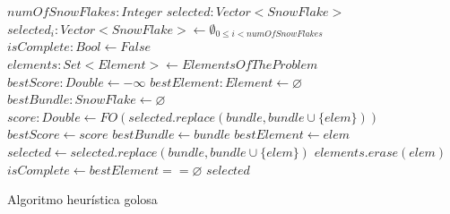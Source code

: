 \begin{algorithm}[H]
\begin{algorithmic}[1]
\REQUIRE $numOfSnowFlakes:Integer$
\ENSURE $selected:Vector<SnowFlake>$
\STATE $selected_{i}:Vector<SnowFlake> \leftarrow \emptyset_{0\leq i<numOfSnowFlakes}$
\STATE $isComplete:Bool \leftarrow False$
\STATE $elements:Set<Element> \leftarrow ElementsOfTheProblem$
  \STATE $bestScore:Double \leftarrow -\infty$
  \STATE $bestElement:Element \leftarrow \varnothing$
  \STATE $bestBundle:SnowFlake \leftarrow \varnothing$
        \STATE $score:Double \leftarrow FO(selected.replace(bundle, bundle \cup \{elem\}))$
          \STATE $bestScore \leftarrow score$
          \STATE $bestBundle \leftarrow bundle$
          \STATE $bestElement \leftarrow elem$
        \ENDIF
      \ENDIF
    \ENDFOR
  \ENDFOR
  \STATE $selected \leftarrow selected.replace(bundle, bundle \cup \{elem\})$
  \STATE $elements.erase(elem)$
  \STATE $isComplete \leftarrow bestElement == \varnothing$
\ENDWHILE
\RETURN $selected$
\end{algorithmic}
\caption{Algoritmo heurística golosa}\label{alg:algHeuGol}
\end{algorithm}

